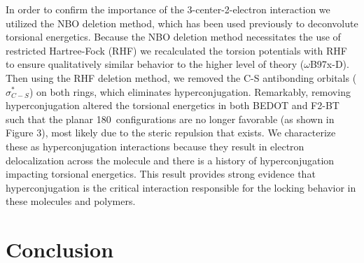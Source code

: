 In order to confirm the importance of the 3-center-2-electron interaction we utilized the NBO deletion method\cite{NBO6}, which has been used previously to deconvolute torsional energetics.\cite{Pophristic2001} Because the NBO deletion method necessitates the use of restricted Hartree-Fock (RHF) we recalculated the torsion potentials with RHF to ensure qualitatively similar behavior to the higher level of theory ($\omega$B97x-D). Then using the RHF deletion method, we removed the C-S antibonding orbitals ($\sigma^{*}_{C-S}$) on both rings, which eliminates hyperconjugation. Remarkably, removing hyperconjugation altered the torsional energetics in both BEDOT and F2-BT such that the planar 180\textdegree \ configurations are no longer favorable (as shown in Figure 3), most likely due to the steric repulsion that exists. We characterize these as hyperconjugation interactions because they result in electron delocalization across the molecule and there is a history of hyperconjugation impacting torsional energetics.\cite{Pophristic2001, R.Rablen1999} This result provides strong evidence that hyperconjugation is the critical interaction responsible for the locking behavior in these molecules and polymers.

\section{Conclusion}

